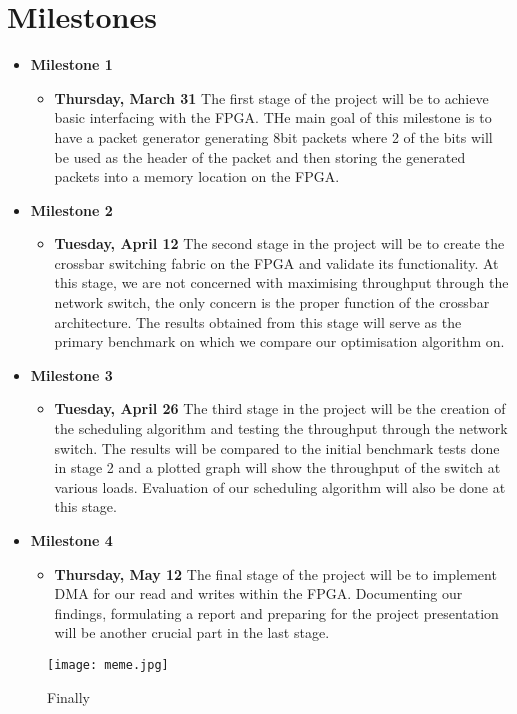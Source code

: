 \documentclass[twoside,12pt,fleqn]{book} %
\begin{document}

\chapter{Milestones}

 \begin{itemize}
     \item \textbf{Milestone 1}
     \begin{itemize}
         \item \textbf{Thursday, March 31} The first stage of the project will be to achieve basic interfacing with the FPGA. THe main goal of this milestone is to have a packet generator generating 8bit packets where 2 of the bits will be used as the header of the packet and then storing the generated packets into a memory location on the FPGA. 
     \end{itemize}
     \item \textbf{Milestone 2}
        \begin{itemize}
            \item \textbf{Tuesday, April 12} The second stage in the project will be to create the crossbar switching fabric on the FPGA and validate its functionality. At this stage, we are not concerned with maximising throughput through the network switch, the only concern is the proper function of the crossbar architecture. The results obtained from this stage will serve as the primary benchmark on which we compare our optimisation algorithm on.
        \end{itemize}
     \item \textbf{Milestone 3}
        \begin{itemize}
            \item \textbf{Tuesday, April 26} The third stage in the project will be the creation of the scheduling algorithm and testing the throughput through the network switch. The results will be compared to the initial benchmark tests done in stage 2 and a plotted graph will show the throughput of the switch at various loads. Evaluation of our scheduling algorithm will also be done at this stage. 
        \end{itemize}
    \item \textbf{Milestone 4}
        \begin{itemize}
            \item \textbf{Thursday, May 12} The final stage of the project will be to implement DMA for our read and writes within the FPGA. 
            Documenting our findings, formulating a report and preparing for the project presentation will be another crucial part in the last stage.
        \end{itemize}
 \end{itemize}

\begin{figure}[ht]
    \centering
    \texttt{[image: meme.jpg]}
    \caption{Finally}
    \label{fig:meme}
\end{figure}
\end{document}
